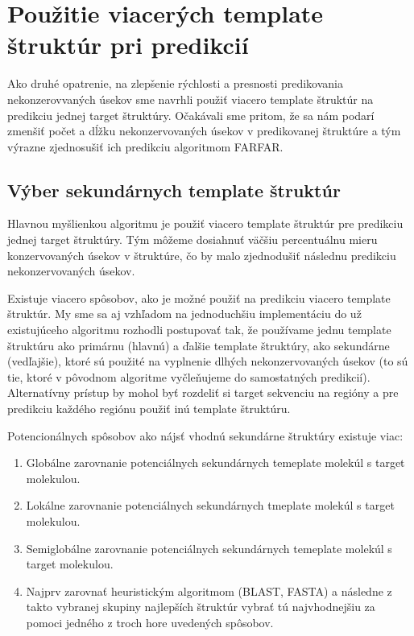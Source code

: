 \chapter{Použitie viacerých template štruktúr pri predikcií}

Ako druhé opatrenie, na zlepšenie rýchlosti a presnosti predikovania nekonzerovvaných úsekov sme navrhli  použiť viacero template štruktúr na predikciu jednej target štruktúry. Očakávali sme pritom, že sa nám podarí zmenšiť počet a dĺžku nekonzervovaných úsekov v predikovanej štruktúre a tým výrazne zjednosušiť ich predikciu algoritmom FARFAR.

\section{Výber sekundárnych template štruktúr}
Hlavnou myšlienkou algoritmu je použiť viacero template štruktúr pre predikciu jednej target štruktúry. Tým môžeme dosiahnuť väčšiu percentuálnu mieru konzervovaných úsekov v štruktúre, čo by malo zjednodušiť následnu predikciu nekonzervovaných úsekov.


\indent  Existuje viacero spôsobov, ako je možné použiť na predikciu viacero template štruktúr. My sme sa aj vzhľadom na jednoduchšiu implementáciu do už existujúceho algoritmu rozhodli postupovať tak, že používame jednu template štruktúru ako primárnu (hlavnú) a ďalšie template štruktúry, ako sekundárne (vedľajšie), ktoré sú použité na vyplnenie dlhých nekonzervovaných úsekov (to sú tie, ktoré v pôvodnom algoritme vyčleňujeme do samostatných predikcií). Alternatívny prístup by mohol byť rozdeliť si target sekvenciu na regióny a pre predikciu každého regiónu použiť inú template štruktúru.   


\indent Potencionálnych spôsobov ako nájsť vhodnú sekundárne štruktúry existuje viac: 
\begin{enumerate}
\item Globálne zarovnanie potenciálnych sekundárnych temeplate molekúl s target molekulou. 
\item Lokálne zarovnanie potenciálnych sekundárnych tmeplate molekúl s target molekulou. 
\item Semiglobálne zarovnanie potenciálnych sekundárnych temeplate molekúl s target molekulou. 
\item Najprv zarovnať heuristickým algoritmom (BLAST, FASTA) a následne z takto vybranej skupiny najlepších štruktúr vybrať tú najvhodnejšiu za pomoci jedného z troch hore uvedených spôsobov.
\end{enumerate}


